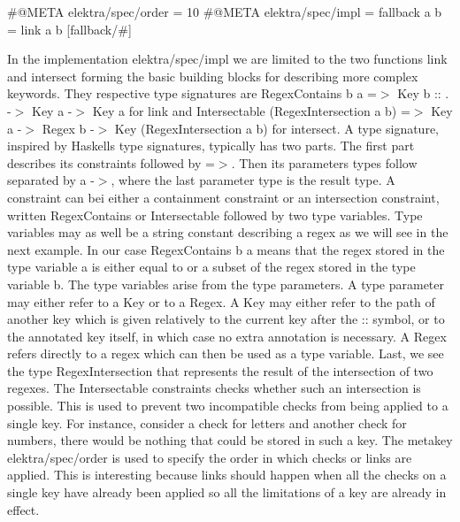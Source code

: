 \begin{DoxyCode}
#@META elektra/spec/order = 10
#@META elektra/spec/impl = fallback a b = link a b
[fallback/#]
\end{DoxyCode}


In the implementation {\ttfamily elektra/spec/impl} we are limited to the two functions {\ttfamily link} and {\ttfamily intersect} forming the basic building blocks for describing more complex keywords. They respective type signatures are {\ttfamily Regex\+Contains b a =$>$ Key b \+:\+: . -\/$>$ Key a -\/$>$ Key a} for {\ttfamily link} and {\ttfamily Intersectable (Regex\+Intersection a b) =$>$ Key a -\/$>$ Regex b -\/$>$ Key (Regex\+Intersection a b)} for {\ttfamily intersect}. A type signature, inspired by Haskell\textquotesingle{}s type signatures, typically has two parts. The first part describes its constraints followed by {\ttfamily =$>$}. Then its parameter\textquotesingle{}s types follow separated by a {\ttfamily -\/$>$}, where the last parameter type is the result type. A constraint can bei either a containment constraint or an intersection constraint, written {\ttfamily Regex\+Contains} or {\ttfamily Intersectable} followed by two type variables. Type variables may as well be a string constant describing a regex as we will see in the next example. In our case {\ttfamily Regex\+Contains b a} means that the regex stored in the type variable a is either equal to or a subset of the regex stored in the type variable b. The type variables arise from the type parameters. A type parameter may either refer to a {\ttfamily Key} or to a {\ttfamily Regex}. A {\ttfamily Key} may either refer to the path of another key which is given relatively to the current key after the {\ttfamily \+:\+:} symbol, or to the annotated key itself, in which case no extra annotation is necessary. A {\ttfamily Regex} refers directly to a regex which can then be used as a type variable. Last, we see the type {\ttfamily Regex\+Intersection} that represents the result of the intersection of two regexes. The {\ttfamily Intersectable} constraints checks whether such an intersection is possible. This is used to prevent two incompatible checks from being applied to a single key. For instance, consider a check for letters and another check for numbers, there would be nothing that could be stored in such a key. The metakey {\ttfamily elektra/spec/order} is used to specify the order in which checks or links are applied. This is interesting because links should happen when all the checks on a single key have already been applied so all the limitations of a key are already in effect.

